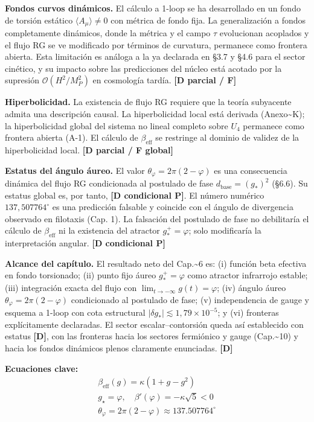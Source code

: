 ﻿\documentclass[11pt,letterpaper]{article}
\begin{document}
\textbf{Fondos curvos dinámicos.} El cálculo a 1-loop se ha desarrollado en un fondo de torsión estático $\langle A_\mu\rangle \neq 0$ con métrica de fondo fija. La generalización a fondos completamente dinámicos, donde la métrica y el campo $\tau$ evolucionan acoplados y el flujo RG se ve modificado por términos de curvatura, permanece como frontera abierta. Esta limitación es análoga a la ya declarada en §3.7 y §4.6 para el sector cinético, y su impacto sobre las predicciones del núcleo está acotado por la supresión $\mathcal{O}(H^2/M_P^2)$ en cosmología tardía. \textbf{[D parcial / F]}

\textbf{Hiperbolicidad.} La existencia de flujo RG requiere que la teoría subyacente admita una descripción causal. La hiperbolicidad local está derivada (Anexo\textasciitilde{}K); la hiperbolicidad global del sistema no lineal completo sobre $U_4$ permanece como frontera abierta (A-1). El cálculo de $\beta_{\text{eff}}$ se restringe al dominio de validez de la hiperbolicidad local. \textbf{[D parcial / F global]}

\textbf{Estatus del ángulo áureo.} El valor $\theta_\varphi = 2\pi(2 - \varphi)$ es una consecuencia dinámica del flujo RG condicionada al postulado de fase $d_{\text{base}} = (g_*)^2$ (§6.6). Su estatus global es, por tanto, \textbf{[D condicional P]}. El número numérico $137{,}507764^\circ$ es una predicción falsable y coincide con el ángulo de divergencia observado en filotaxis (Cap. 1). La falsación del postulado de fase no debilitaría el cálculo de $\beta_{\text{eff}}$ ni la existencia del atractor $g_*^+ = \varphi$; solo modificaría la interpretación angular. \textbf{[D condicional P]}

\textbf{Alcance del capítulo.} El resultado neto del Cap.\textasciitilde{}6 es: (i) función beta efectiva en fondo torsionado; (ii) punto fijo áureo $g_*^+ = \varphi$ como atractor infrarrojo estable; (iii) integración exacta del flujo con $\lim_{t \to -\infty} g(t) = \varphi$; (iv) ángulo áureo $\theta_\varphi = 2\pi(2 - \varphi)$ condicionado al postulado de fase; (v) independencia de gauge y esquema a 1-loop con cota estructural $|\delta g_*| \lesssim 1{,}79 \times 10^{-5}$; y (vi) fronteras explícitamente declaradas. El sector escalar--contorsión queda así establecido con estatus \textbf{[D]}, con las fronteras hacia los sectores fermiónico y gauge (Cap.\textasciitilde{}10) y hacia los fondos dinámicos plenos claramente enunciadas. \textbf{[D]}

\textbf{Ecuaciones clave:}
\begin{align*}
    \beta_{\mathrm{eff}}(g) = \kappa(1+g-g^2) \\
    g_\star = \varphi, \quad \beta'(\varphi) = -\kappa\sqrt{5} < 0 \\
    \theta_\varphi = 2\pi(2-\varphi) \approx 137.507764^\circ
\end{align*}
\end{document}
